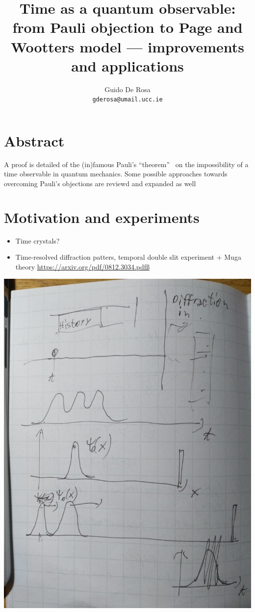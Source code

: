 \documentclass{book}
\author{Guido De Rosa \\ \small\tt{gderosa@umail.ucc.ie}}
\title{Time as a quantum observable: from Pauli objection to Page and Wootters model --- improvements and applications}
\begin{document}
\maketitle

\tableofcontents

\chapter*{Abstract}
A proof is detailed of the (in)famous Pauli's ``theorem''~\cite{PauliFootnote}
on the impossibility of a time observable in quantum mechanics. Some possible
approaches towards overcoming Pauli's objections are reviewd and expanded as well

\chapter{Motivation and experiments}
\begin{itemize}
  \item Time crystals?
  \item Time-resolved diffraction patters, temporal double slit experiment + Muga theory \url{https://arxiv.org/pdf/0812.3034.pdfß}
\end{itemize}
\clearpage\includegraphics[width=\linewidth]{img/diffraction.jpg}
\end{document}
